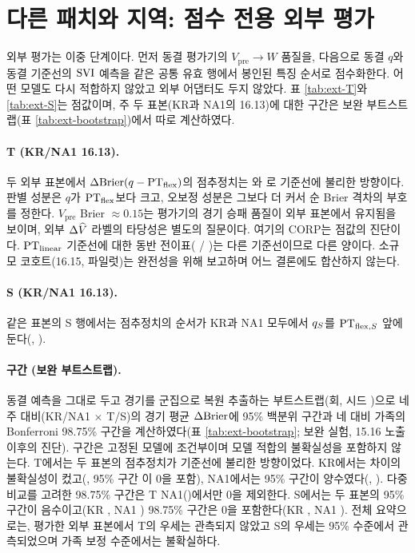 \section{다른 패치와 지역: 점수 전용 외부 평가}
\label{sec:val-external}

외부 평가는 이중 단계이다. 먼저 동결 평가기의 $V_{\mathrm{pre}} \to W$ 품질을, 다음으로 동결 $q$와 동결 기준선의 $\mathrm{SVI}$ 예측을 같은 공통 유효 행에서 봉인된 특징 순서로 점수화한다. 어떤 모델도 다시 적합하지 않았고 외부 어댑터도 두지 않았다. 표 \ref{tab:ext-T}와 \ref{tab:ext-S}는 점값이며, 주 두 표본(KR과 NA1의 16.13)에 대한 구간은 보완 부트스트랩(표 \ref{tab:ext-bootstrap})에서 따로 계산하였다.



\paragraph{T (KR/NA1 16.13).} 두 외부 표본에서 $\Delta\mathrm{Brier}(q - \mathrm{PT}_{\mathrm{flex}})$의 점추정치는 \extTKRdBrier{}와 \extTNAdBrier{}로 기준선에 불리한 방향이다. 판별 성분은 $q$가 $\mathrm{PT}_{\mathrm{flex}}$보다 크고, 오보정 성분은 그보다 더 커서 순 Brier 격차의 부호를 정한다. $V_{\mathrm{pre}}$ Brier $\approx 0.15$는 평가기의 경기 승패 품질이 외부 표본에서 유지됨을 보이며, 외부 $\Delta\widehat V$ 라벨의 타당성은 별도의 질문이다. 여기의 CORP는 점값의 진단이다. $\mathrm{PT}_{\mathrm{linear}}$ 기준선에 대한 동반 전이표(\extTKRdBrierLin{} / \extTNAdBrierLin{})는 다른 기준선이므로 다른 양이다. 소규모 코호트(16.15, 파일럿)는 완전성을 위해 보고하며 어느 결론에도 합산하지 않는다.



\paragraph{S (KR/NA1 16.13).} 같은 표본의 S 행에서는 점추정치의 순서가 KR과 NA1 모두에서 $q_{S}$를 $\mathrm{PT}_{\mathrm{flex},S}$ 앞에 둔다(\extSKRdBrier{}, \extSNAdBrier{}). 

\paragraph{구간 (보완 부트스트랩).} 동결 예측을 그대로 두고 경기를 군집으로 복원 추출하는 부트스트랩(\ebBoot{}회, 시드 \ebSeed{})으로 네 주 대비(KR/NA1 $\times$ T/S)의 경기 평균 $\Delta\mathrm{Brier}$에 95\% 백분위 구간과 네 대비 가족의 Bonferroni 98.75\% 구간을 계산하였다(표 \ref{tab:ext-bootstrap}; 보완 실험, 15.16 노출 이후의 진단). 구간은 고정된 모델에 조건부이며 모델 적합의 불확실성을 포함하지 않는다. T에서는 두 표본의 점추정치가 기준선에 불리한 방향이었다. KR에서는 차이의 불확실성이 컸고(\ebTKRD{}, 95\% 구간 \ci{\ebTKRLo}{\ebTKRHi}이 0을 포함), NA1에서는 95\% 구간이 양수였다(\ebTNAD{}, \ci{\ebTNALo}{\ebTNAHi}). 다중비교를 고려한 98.75\% 구간은 T NA1(\ci{\ebTNALoB}{\ebTNAHiB})에서만 0을 제외한다. S에서는 두 표본의 95\% 구간이 음수이고(KR \ebSKRD{} \ci{\ebSKRLo}{\ebSKRHi}, NA1 \ebSNAD{} \ci{\ebSNALo}{\ebSNAHi}) 98.75\% 구간은 0을 포함한다(KR \ci{\ebSKRLoB}{\ebSKRHiB}, NA1 \ci{\ebSNALoB}{\ebSNAHiB}). 전체 요약으로는, 평가한 외부 표본에서 T의 우세는 관측되지 않았고 S의 우세는 95\% 수준에서 관측되었으며 가족 보정 수준에서는 불확실하다.

